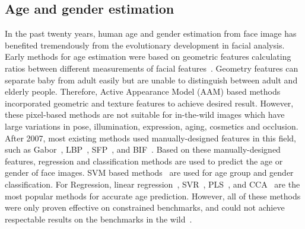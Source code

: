 \documentclass[journal]{IEEEtran}
\begin{document}
\subsection{Age and gender estimation}
In the past twenty years, human age and gender estimation from face image has benefited tremendously from the evolutionary development in facial analysis. Early methods for age estimation were based on geometric features calculating ratios between different measurements of facial features~\cite{Kwon}. Geometry features can separate baby from adult easily but are unable to distinguish between adult and elderly people. Therefore, Active Appearance Model (AAM) based methods~\cite{FG-NETAAM} incorporated geometric and texture features to achieve desired result. However, these pixel-based methods are not suitable for in-the-wild images which have large variations in pose, illumination, expression, aging, cosmetics and occlusion.
After 2007, most existing methods used manually-designed features in this field, such as Gabor~\cite{AgeGabor}, LBP~\cite{AgeLbp}, SFP~\cite{AgeSfp}, and BIF~\cite{AgeBifSVMSVR}. Based on these manually-designed features, regression and classification methods are used to predict the age or gender of face images. 
SVM based methods~\cite{AgeBifSVMSVR,AgeSVMdrop} are used for age group and gender classification. For Regression, linear regression~\cite{AgeLR}, SVR~\cite{AgeSVR}, PLS~\cite{AgePls}, and CCA~\cite{AgeCCA} are the most popular methods for accurate age prediction. However, all of these methods were only proven effective on constrained benchmarks, and could not achieve respectable results on the benchmarks in the wild~\cite{shan2010learning,AgeSVMdrop}. \par 
\end{document}
